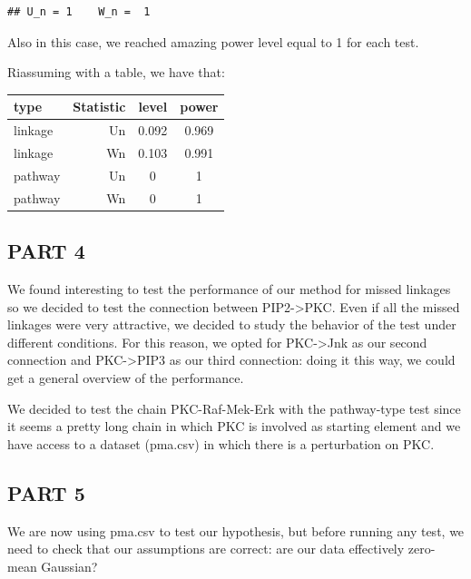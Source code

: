 \documentclass[
]{article}
\newenvironment{Shaded}{\begin{snugshade}}{\end{snugshade}}
\newcommand{\CommentTok}[1]{\textcolor[rgb]{0.56,0.35,0.01}{\textit{#1}}}
\begin{document}
\begin{verbatim}
## U_n = 1    W_n =  1
\end{verbatim}

\begin{Shaded}
\end{Shaded}

Also in this case, we reached amazing power level equal to 1 for each
test.

Riassuming with a table, we have that:

\begin{longtable}[]{@{}lrcc@{}}
\toprule
type & Statistic & level & power\tabularnewline
\midrule
\endhead
linkage & Un & 0.092 & 0.969\tabularnewline
linkage & Wn & 0.103 & 0.991\tabularnewline
pathway & Un & 0 & 1\tabularnewline
pathway & Wn & 0 & 1\tabularnewline
\bottomrule
\end{longtable}

\hypertarget{part-4}{%
\subsection{PART 4}\label{part-4}}

We found interesting to test the performance of our method for missed
linkages so we decided to test the connection between
PIP2-\textgreater PKC. Even if all the missed linkages were very
attractive, we decided to study the behavior of the test under different
conditions. For this reason, we opted for PKC-\textgreater Jnk as our
second connection and PKC-\textgreater PIP3 as our third connection:
doing it this way, we could get a general overview of the performance.

We decided to test the chain PKC-Raf-Mek-Erk with the pathway-type test
since it seems a pretty long chain in which PKC is involved as starting
element and we have access to a dataset (pma.csv) in which there is a
perturbation on PKC.

\hypertarget{part-5}{%
\subsection{PART 5}\label{part-5}}

We are now using pma.csv to test our hypothesis, but before running any
test, we need to check that our assumptions are correct: are our data
effectively zero-mean Gaussian?
\end{document}
